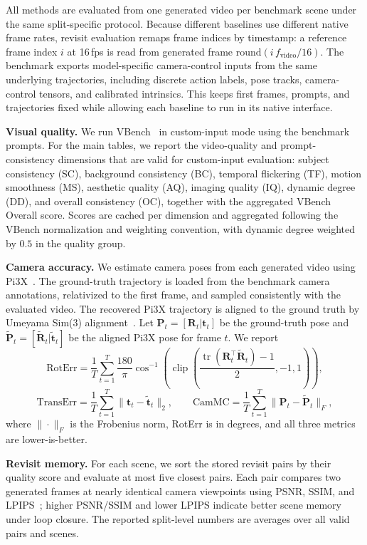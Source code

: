 \documentclass{llmxive}
\begin{document}
All methods are evaluated from one generated video per benchmark scene under the same split-specific protocol.
Because different baselines use different native frame rates, revisit evaluation remaps frame indices by timestamp: a reference frame index $i$ at 16\,fps is read from generated frame $\mathrm{round}(i\,f_{\mathrm{video}}/16)$.
The benchmark exports model-specific camera-control inputs from the same underlying trajectories, including discrete action labels, pose tracks, camera-control tensors, and calibrated intrinsics.
This keeps first frames, prompts, and trajectories fixed while allowing each baseline to run in its native interface.

\noindent\textbf{Visual quality.}
We run VBench~\citep{vbench} in custom-input mode using the benchmark prompts.
For the main tables, we report the video-quality and prompt-consistency dimensions that are valid for custom-input evaluation: subject consistency (SC), background consistency (BC), temporal flickering (TF), motion smoothness (MS), aesthetic quality (AQ), imaging quality (IQ), dynamic degree (DD), and overall consistency (OC), together with the aggregated VBench Overall score.
Scores are cached per dimension and aggregated following the VBench normalization and weighting convention, with dynamic degree weighted by $0.5$ in the quality group.

\noindent\textbf{Camera accuracy.}
We estimate camera poses from each generated video using Pi3X~\citep{pi3x}.
The ground-truth trajectory is loaded from the benchmark camera annotations, relativized to the first frame, and sampled consistently with the evaluated video.
The recovered Pi3X trajectory is aligned to the ground truth by Umeyama Sim(3) alignment~\citep{umeyama}.
Let $\mathbf{P}_t=[\mathbf{R}_t|\mathbf{t}_t]$ be the ground-truth pose and $\widetilde{\mathbf{P}}_t=[\widetilde{\mathbf{R}}_t|\widetilde{\mathbf{t}}_t]$ be the aligned Pi3X pose for frame $t$.
We report
\[
\mathrm{RotErr}=\frac{1}{T}\sum_{t=1}^{T}\frac{180}{\pi}
\cos^{-1}\!\left(\operatorname{clip}\!\left(\frac{\operatorname{tr}(\mathbf{R}_t^\top\widetilde{\mathbf{R}}_t)-1}{2},-1,1\right)\right),
\]
\[
\mathrm{TransErr}=\frac{1}{T}\sum_{t=1}^{T}\|\mathbf{t}_t-\widetilde{\mathbf{t}}_t\|_2,\qquad
\mathrm{CamMC}=\frac{1}{T}\sum_{t=1}^{T}\|\mathbf{P}_t-\widetilde{\mathbf{P}}_t\|_F,
\]
where $\|\cdot\|_F$ is the Frobenius norm, RotErr is in degrees, and all three metrics are lower-is-better.

\noindent\textbf{Revisit memory.}
For each scene, we sort the stored revisit pairs by their quality score and evaluate at most five closest pairs.
Each pair compares two generated frames at nearly identical camera viewpoints using PSNR, SSIM, and LPIPS~\citep{lpips}; higher PSNR/SSIM and lower LPIPS indicate better scene memory under loop closure.
The reported split-level numbers are averages over all valid pairs and scenes.
\end{document}
